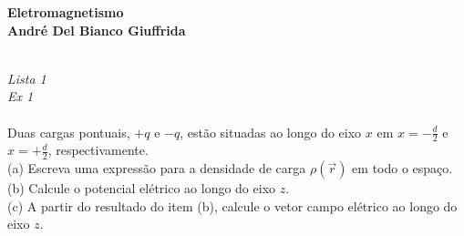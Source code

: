 \documentclass[a4paper,11pt]{exam}
\begin{document}
\begingroup 
	  \bf \Large Eletromagnetismo\\
	  \indent \normalsize André Del Bianco Giuffrida
	\endgroup
	\\ \quad
	\\
	\large{
	\emph{Lista 1 \\ Ex 1}
	\\
	\\
	Duas cargas pontuais, $+q$ e $-q$, estão situadas ao longo do eixo $x$ em $x=-\frac{d}{2}$ e $x = +\frac{d}{2}$, respectivamente.
	\\
	(a) Escreva uma expressão para a densidade de carga $\rho(\vec{r})$ em todo o espaço.
	\\
	(b) Calcule o potencial elétrico ao longo do eixo $z$.
	\\
	(c) A partir do resultado do item (b), calcule o vetor campo elétrico ao longo do eixo $z$.
	\\
	\\
	\normalsize
	
	\begin{center}
	\end{center}
	
}
\end{document}
